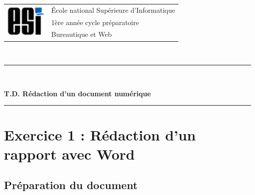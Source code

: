 \documentclass[11pt, a4paper]{article}
\begin{document}

\noindent
\begin{tabular}{ll}
\multirow{3}{*}{\includegraphics[width=2cm]{../esi-logo.png}} & \'Ecole national Supérieure d'Informatique\\
& 1ère année cycle préparatoire\\
& Bureautique et Web
\end{tabular}\\[.25cm]
\noindent\rule{\textwidth}{1pt}\\ %
\hspace{-12pt}
\begin{center}
{\LARGE \textbf{T.D. Rédaction d'un document numérique}}
\end{center}
\noindent\rule{\textwidth}{1pt}

\section*{Exercice 1 : Rédaction d'un rapport avec Word}

\subsection*{Préparation du document}
\end{document}
